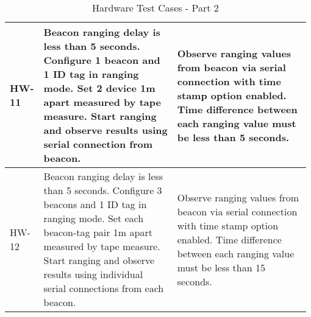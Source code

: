 \begin{table}[h!]
\begin{tabular}{|p{0.075\linewidth}|p{0.45\linewidth}|p{0.45\linewidth}|}
	\hline 
	HW-11
	& Beacon ranging delay is less than 5 seconds. Configure 1 beacon and 1 ID tag in ranging mode. Set 2 device 1m apart measured by tape measure. Start ranging and observe results using serial connection from beacon.
	& Observe ranging values from beacon via serial connection with time stamp option enabled. Time difference between each ranging value must be less than 5 seconds. \\
	
	\hline
	HW-12
	& Beacon ranging delay is less than 5 seconds. Configure 3 beacons and 1 ID tag in ranging mode. Set each beacon-tag pair 1m apart measured by tape measure. Start ranging and observe results using individual serial connections from each beacon.
	& Observe ranging values from beacon via serial connection with time stamp option enabled. Time difference between each ranging value must be less than 15 seconds. \\
	
	  \hline
    \end{tabular}
    \caption{Hardware Test Cases - Part 2}
\end{table}

